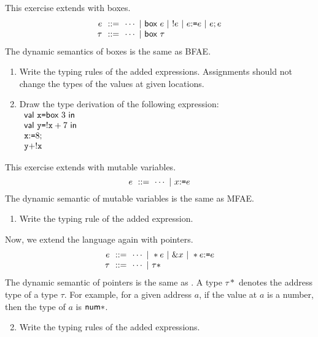 \begin{exercise}

This exercise extends \lang with boxes.
  \[
    \begin{array}{r@{~~}r@{~~}l}
      e & ::= & \cdots
      \ |\ \eref{e}
      \ |\ \ederef{e}
      \ |\ \eset{e}{e}
      \ |\ \eseq{e}{e} \\
      \tau & ::= & \cdots\ |\ \textsf{box}\ \tau \\
    \end{array}
  \]
      The dynamic semantics of boxes is the same as \textsf{BFAE}.
\begin{enumerate}
  \item Write the typing rules of the added expressions.
  Assignments should not change the types of the values at given locations.
  \item Draw the type derivation of the following expression:\\
  $
  \begin{array}{l}
    \ebind{\cx}{\eref{3}}{\\
    \ebind{\cy}{\ederef{\cx}+7}{\\
    \eseq{\eset{\cx}{8}}{\\
    \cy+\ederef{\cx}
    }}}
  \end{array}
  $
\end{enumerate}

\end{exercise}

\begin{exercise}

This exercise extends \lang with mutable variables.
  \[ e\ ::=\ \cdots\ |\ \eset{x}{e} \]
    The dynamic semantic of mutable variables is the same as \textsf{MFAE}.
\begin{enumerate}
  \item Write the typing rule of the added expression.
\end{enumerate}
Now, we extend the language again with pointers.
\[
  \begin{array}{r@{~~}r@{~~}l}
    e & ::= & \cdots\ |\ \ast e \ |\ \& x\ |\ \ast\eset{e}{e} \\
    \tau & ::= & \cdots\ |\ \tau\ast
  \end{array}
\]
The dynamic semantic of pointers is the same as .
A type $\tau\ast$ denotes the address type of a type $\tau$.
For example, for a given address $a$, if the value at $a$ is a number,
then the type of $a$ is $\tnum\ast$.

\begin{enumerate}
  \setcounter{enumi}{1}
  \item Write the typing rules of the added expressions.
\end{enumerate}

\end{exercise}
